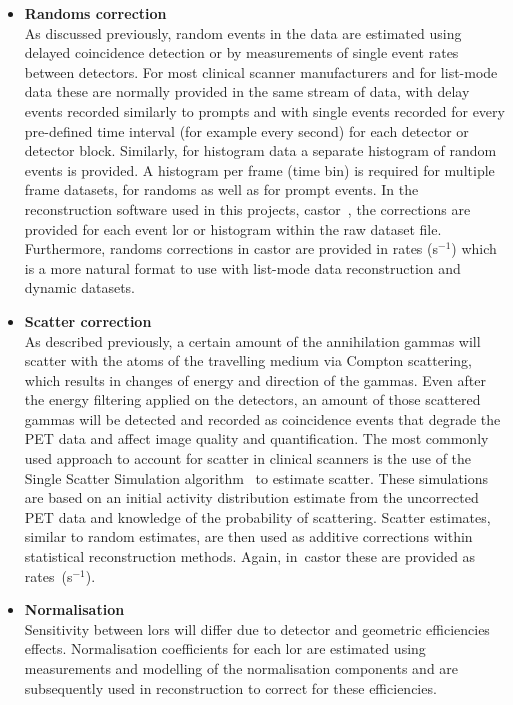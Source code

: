\begin{itemize}
\item\textbf{Randoms correction}\\
As discussed previously, random events in the data are estimated using delayed coincidence detection or by measurements of single event rates between detectors. For most clinical scanner manufacturers and for list-mode data these are normally provided in the same stream of data, with delay events recorded similarly to prompts and with single events recorded for every pre-defined time interval (for example every second) for each detector or detector block. Similarly, for histogram data a separate histogram of random events is provided. A histogram per frame (time bin) is required for multiple frame datasets, for randoms as well as for prompt events. 
In the reconstruction software used in this projects, \gls{castor}~\cite{Merlin2018}, the corrections are provided for each event \gls{lor} or histogram within the raw dataset file. Furthermore, randoms corrections in \gls{castor} are provided in rates (s$^{-1}$) which is a more natural format to use with list-mode data reconstruction and dynamic datasets.
\item\textbf{Scatter correction}\\
As described previously, a certain amount of the annihilation gammas will scatter with the atoms of the travelling medium via Compton scattering, which results in changes of energy and direction of the gammas. Even after the energy filtering applied on the detectors, an amount of those scattered gammas will be detected and recorded as coincidence events that degrade the PET data and affect image quality and quantification. The most commonly used approach to account for scatter in clinical scanners is the use of the Single Scatter Simulation algorithm~\cite{Watson1996} to estimate scatter. These simulations are based on an initial activity distribution estimate from the uncorrected PET data and knowledge of the probability of scattering. 
Scatter estimates, similar to random estimates, are then used as additive corrections within statistical reconstruction methods. Again, in~\gls{castor} these are provided as \mbox{rates (s$^{-1}$)}. 
\item\textbf{Normalisation}\\ 
Sensitivity between \glspl{lor} will differ due to detector and geometric efficiencies effects. Normalisation coefficients for each \gls{lor} are estimated using measurements and modelling of the normalisation components and are subsequently used in reconstruction to correct for these efficiencies.

\end{itemize}

